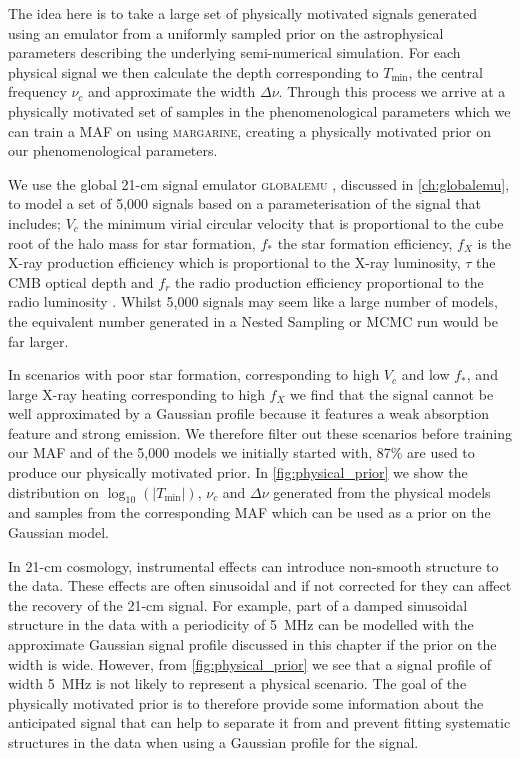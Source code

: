 The idea here is to take a large set of physically motivated signals generated using an emulator from a uniformly sampled prior on the astrophysical parameters describing the underlying semi-numerical simulation. For each physical signal we then calculate the depth corresponding to $T_\mathrm{min}$, the central frequency $\nu_c$ and approximate the width $\Delta \nu$. Through this process we arrive at a physically motivated set of samples in the phenomenological parameters which we can train a MAF on using \textsc{margarine}, creating a physically motivated prior on our phenomenological parameters.

We use the global 21-cm signal emulator \textsc{globalemu} \citep{Bevins_globalemu_2021}, discussed in \cref{ch:globalemu}, to model a set of 5,000 signals based on a parameterisation of the signal that includes; $V_c$ the minimum virial circular velocity that is proportional to the cube root of the halo mass for star formation, $f_*$ the star formation efficiency, $f_X$ is the X-ray production efficiency which is proportional to the X-ray luminosity, $\tau$ the CMB optical depth and $f_r$ the radio production efficiency proportional to the radio luminosity \cite{Reis2020}.
Whilst 5,000 signals may seem like a large number of models, the equivalent number generated in a Nested Sampling or MCMC run would be far larger.

In scenarios with poor star formation, corresponding to high $V_c$ and low $f_*$, and large X-ray heating corresponding to high $f_X$ we find that the signal cannot be well approximated by a Gaussian profile because it features a weak absorption feature and strong emission. We therefore filter out these scenarios before training our MAF and of the 5,000 models we initially started with, 87\% are used to produce our physically motivated prior. In \cref{fig:physical_prior} we show the distribution on $\log_{10}(|T_\mathrm{min}|)$, $\nu_c$ and $\Delta \nu$ generated from the physical models and samples from the corresponding MAF which can be used as a prior on the Gaussian model.

In 21-cm cosmology, instrumental effects can introduce non-smooth structure to the data. These effects are often sinusoidal \citep[e.g.][]{Bevins_maxsmooth_2021, Bevins_SARAS2_2022} and if not corrected for they can affect the recovery of the 21-cm signal. For example, part of a damped sinusoidal structure in the data with a periodicity of 5~MHz can be modelled with the approximate Gaussian signal profile discussed in this chapter if the prior on the width is wide. However, from \cref{fig:physical_prior} we see that a signal profile of width 5~MHz is not likely to represent a physical scenario. The goal of the physically motivated prior is to therefore provide some information about the anticipated signal that can help to separate it from and prevent fitting systematic structures in the data when using a Gaussian profile for the signal.

